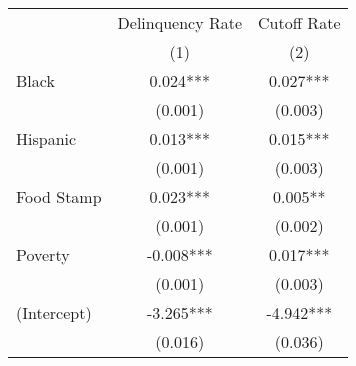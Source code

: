 \begin{tabular}{lcc}
\toprule 
\midrule 
 & Delinquency Rate & Cutoff Rate \\
 & (1) & (2) \\
\midrule 
Black & 0.024*** & 0.027*** \\
 & (0.001) & (0.003) \\
Hispanic & 0.013*** & 0.015*** \\
 & (0.001) & (0.003) \\
Food Stamp & 0.023*** & 0.005** \\
 & (0.001) & (0.002) \\
Poverty & -0.008*** & 0.017*** \\
 & (0.001) & (0.003) \\
(Intercept) & -3.265*** & -4.942*** \\
 & (0.016) & (0.036) \\
\midrule 
\bottomrule 
\end{tabular}
